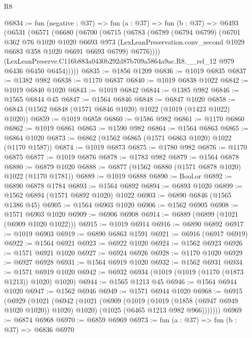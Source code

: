 \begin{lexlean}{R8}
\begin{coremodule}
@6834 := fun (negative : @37) =>
  fun (a : @37) =>
  fun (b : @37) =>
  @6493
    (@6531
      (@6571
        (@6680
          (@6700
            (@6715
              (@6783
                (@6789
                  (@6794 @6799)
                  (@6701
                    @362
                    @76
                    @1020
                    @1020
                    @6693
                    @973
                    (LexLeanPreservation.conv_second @1029 @6683 @358 @1020 @6691 @6693 @6799)
                    @6776))))
            (LexLeanPreserve.C116b883a0430b292d87b709a5864a9ac.R8.__rel_12
              @979
              @6436
              @6450
              @6454)))))
@6835 := @1856 @1209
@6836 := @1019 @6835
@6837 := @1382 @982
@6838 := @1170 @6837
@6840 := @1019 @6838 @1022
@6842 := @1019 @6840 @1020
@6843 := @1019 @6842
@6844 := @1385 @982
@6846 := @1565 @6844 @45
@6847 := @1564 @6846
@6848 := @6847 @1020
@6858 := @6843 (@1562 @6848 (@1571 @6846 @1020) @1022 (@1019 (@1423 @1022) @1020))
@6859 := @1019 @6858
@6860 := @1586 @982
@6861 := @1170 @6860
@6862 := @1019 @6861
@6863 := @1590 @982
@6864 := @1564 @6863
@6865 := @6864 @1020
@6873 := @6862 (@1562 @6865 (@1571 @6863 @1020) @1022 (@1170 @1587))
@6874 := @1019 @6873
@6875 := @1780 @982
@6876 := @1170 @6875
@6877 := @1019 @6876
@6878 := @1783 @982
@6879 := @1564 @6878
@6880 := @6879 @1020
@6888 := @6877 (@1562 @6880 (@1571 @6878 @1020) @1022 (@1170 @1781))
@6889 := @1019 @6888
@6890 := Bool.or
@6892 := @6890 @6878 @1784
@6893 := @1564 @6892
@6894 := @6893 @1020
@6899 := @1562 @6894 (@1571 @6892 @1020) @1022
@6903 := @6890 @6846 (@1565 @1386 @45)
@6905 := @1564 @6903 @1020
@6906 := @1562 @6905
@6908 := @1571 @6903 @1020
@6909 := @6906 @6908
@6914 := @6889 (@6899 (@1021 (@6909 @1020 @1022)))
@6915 := @1019 @6914
@6916 := @6890 @6892
@6917 := @1019 @6903
@6919 := @6890 @6863 @1591
@6921 := @6916 (@6917 @6919)
@6922 := @1564 @6921
@6923 := @6922 @1020
@6924 := @1562 @6923
@6926 := @1571 @6921 @1020
@6927 := @6924 @6926
@6928 := @1170 @1020
@6929 := @6927 @6928
@6931 := @1564 @6919 @1020
@6932 := @1562 @6931
@6934 := @1571 @6919 @1020
@6942 := @6932 @6934 (@1019 (@1019 (@1170 (@1873 @1213)) @1020) @1020)
@6944 := @1565 @1213 @45
@6946 := @1564 @6944 @1020
@6947 := @1562 @6946
@6949 := @1571 @6944 @1020
@6968 := @6915
    (@6929
      (@1021
        (@6942
          (@1021
            (@6909
              (@1019 (@1019 (@1858 (@6947 @6949 @1020 @1020)) @1020) @1020)
              (@1025 (@6465 @1213 @982 @966)))))))
@6969 := @6874 @6968
@6970 := @6859 @6969
@6973 := fun (a : @37) => fun (b : @37) => @6836 @6970

\end{coremodule}
\end{lexlean}
